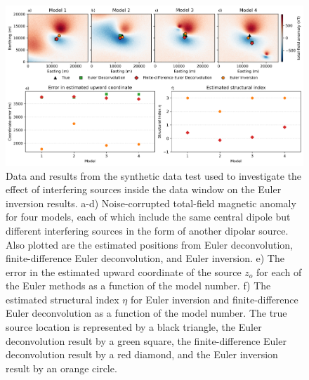 \begin{figure}[tb!]
\centering
\includegraphics[width=1\linewidth]{figures/synthetic-interfering-sources.png}
\caption{
    Data and results from the synthetic data test used to investigate the effect of interfering sources inside the data window on the Euler inversion results.
    a-d) Noise-corrupted total-field magnetic anomaly for four models, each of which include the same central dipole but different interfering sources in the form of another dipolar source. Also plotted are the estimated positions from Euler deconvolution, finite-difference Euler deconvolution, and Euler inversion.
    e) The error in the estimated upward coordinate of the source $z_o$ for each of the Euler methods as a function of the model number.
    f) The estimated structural index $\eta$ for Euler inversion and finite-difference Euler deconvolution as a function of the model number.
    The true source location is represented by a black triangle, the Euler deconvolution result by a green square, the finite-difference Euler deconvolution result by a red diamond, and the Euler inversion result by an orange circle.
}
\label{fig:interf}
\end{figure}

